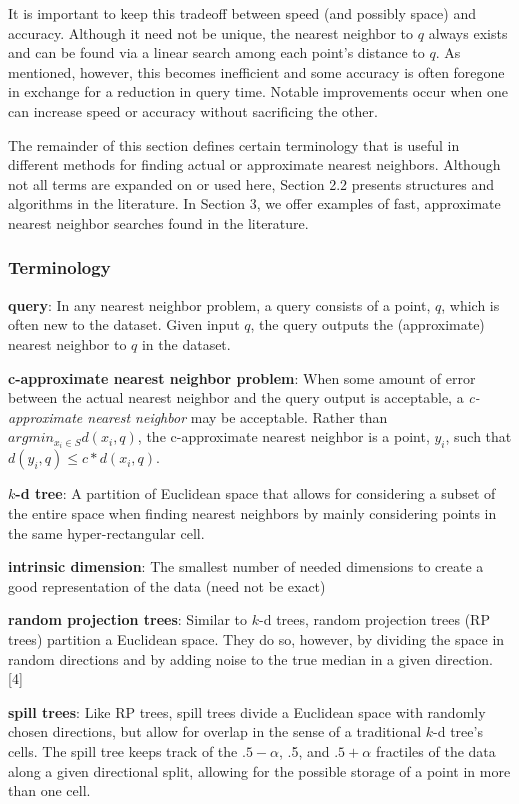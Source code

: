 It is important to keep this tradeoff between speed (and possibly space) and accuracy. Although it need not be unique, the nearest neighbor to $q$ always exists and can be found via a linear search among each point's distance to $q$. As mentioned, however, this becomes inefficient and some accuracy is often foregone in exchange for a reduction in query time. Notable improvements occur when one can increase speed or accuracy without sacrificing the other.

The remainder of this section defines certain terminology that is useful in different methods for finding actual or approximate nearest neighbors. Although not all terms are expanded on or used here, Section 2.2 presents structures and algorithms in the literature. In Section 3, we offer examples of fast, approximate nearest neighbor searches found in the literature. 

\subsubsection{Terminology}

\textbf{query}: In any nearest neighbor problem, a query consists of a point, $q$, which is often new to the dataset. Given input $q$, the query outputs the (approximate) nearest neighbor to $q$ in the dataset.

\hfill \break
\noindent
\textbf{c-approximate nearest neighbor problem}: When some amount of error between the actual nearest neighbor and the query output is acceptable, a \emph{c-approximate nearest neighbor} may be acceptable. Rather than $arg min_{x_i \in S}d(x_i,q)$, the c-approximate nearest neighbor is a point, $y_i$, such that $d(y_i,q)\leq c*d(x_i,q)$.

\hfill \break
\noindent
\textbf{$k$-d tree}: A partition of Euclidean space that allows for considering a subset of the entire space when finding nearest neighbors by mainly considering points in the same hyper-rectangular cell.

\hfill \break
\noindent
\textbf{intrinsic dimension}: The smallest number of needed dimensions to create a good representation of the data (need not be exact)

\hfill \break
\noindent
\textbf{random projection trees}: Similar to $k$-d trees, random projection trees (RP trees) partition a Euclidean space. They do so, however, by dividing the space in random directions and by adding noise to the true median in a given direction. [4]

\hfill \break
\noindent
\textbf{spill trees}: Like RP trees, spill trees divide a Euclidean space with randomly chosen directions, but allow for overlap in the sense of a traditional $k$-d tree's cells. The spill tree keeps track of the $.5-\alpha$, .5, and $.5+\alpha$ fractiles of the data along a given directional split, allowing for the possible storage of a point in more than one cell.


